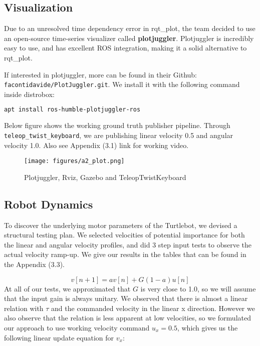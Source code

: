 \documentclass[14pt,letterpaper]{article}
\begin{document}
\subsection{Visualization}

Due to an unresolved time dependency error in rqt\_plot, the team decided to use an open-source time-series visualizer called \textbf{plotjuggler}.
Plotjuggler is incredibly easy to use, and has excellent ROS integration, making it a solid alternative to rqt\_plot.

If interested in plotjuggler, more can be found in their Github: \texttt{facontidavide/PlotJuggler.git}.
We install it with the following command inside distrobox:

\begin{lstlisting}[language=bash]
apt install ros-humble-plotjuggler-ros
\end{lstlisting}

Below figure shows the working ground truth publisher pipeline. Through \texttt{teleop\_twist\_keyboard}, we are publishing linear velocity 0.5 and angular velocity 1.0.
Also see Appendix (3.1) link for working video.
\begin{figure}[H]
\centering
\texttt{[image: figures/a2\_plot.png]}
\caption{Plotjuggler, Rviz, Gazebo and TeleopTwistKeyboard}
\label{fig:step_response}
\end{figure}


\subsection{Robot Dynamics}
To discover the underlying motor parameters of the Turtlebot, we devised a structural testing plan.
We selected velocities of potential importance for both the linear and angular velocity profiles, and did 3 step input tests to observe the actual velocity ramp-up.
We give our results in the tables that can be found in the Appendix (3.3).

\begin{equation}
  v[n+1] = a v[n] + G (1-a) u[n]
  \label{eq:velocity}
\end{equation}
At all of our tests, we approximated that $G$ is very close to 1.0, so we will assume that the input gain is always unitary.
We observed that there is almost a linear relation with $\tau$ and the commanded velocity in the linear x direction. However we also observe that the relation is less apparent at low velocities, so we formulated our approach to
use working velocity command $u_x = 0.5$, which gives us the following linear update equation for $v_x$:
\end{document}
